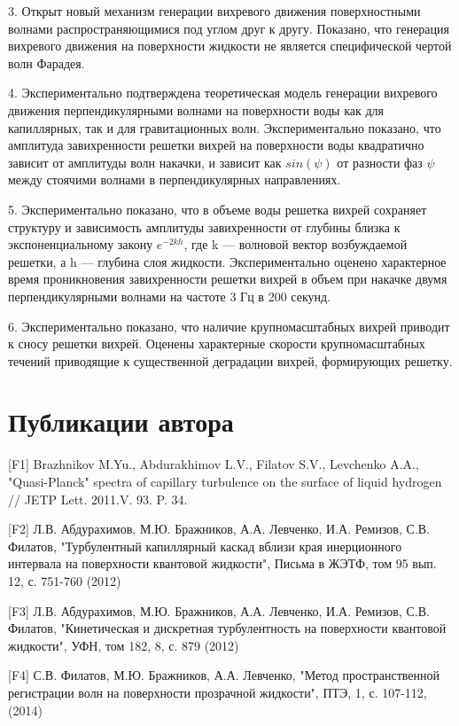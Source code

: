 3. Открыт новый механизм генерации вихревого движения поверхностными волнами распространяющимися под углом друг к другу. Показано, что генерация вихревого движения на поверхности жидкости не является специфической чертой волн Фарадея.

4. Экспериментально подтверждена теоретическая модель генерации вихревого движения перпендикулярными волнами на поверхности воды как для капиллярных, так и для гравитационных волн. Экспериментально показано, что амплитуда завихренности решетки вихрей на поверхности воды квадратично зависит от амплитуды волн накачки, и зависит как $sin(\psi)$ от разности фаз $\psi$ между стоячими волнами в перпендикулярных направлениях. 

5. Экспериментально показано, что в объеме воды решетка вихрей сохраняет структуру и зависимость амплитуды завихренности от глубины близка к экспоненциальному закону $e^{-2kh}$, где k — волновой вектор возбуждаемой решетки, а h — глубина слоя жидкости. 
Экспериментально оценено характерное время проникновения завихренности решетки вихрей в объем при накачке двумя перпендикулярными волнами на частоте 3 Гц в 200 секунд.

6. Экспериментально показано, что наличие крупномасштабных вихрей приводит к сносу решетки вихрей. Оценены характерные скорости крупномасштабных течений приводящие к существенной деградации вихрей, формирующих решетку.


\clearpage 
\chapter*{Публикации автора}	%
%
%
[F1] Brazhnikov M.Yu., Abdurakhimov L.V., Filatov S.V., Levchenko A.A., "Quasi-Planck"{} spectra of capillary turbulence on the surface of liquid hydrogen // JETP Lett. 2011.V. 93. P. 34.

[F2] Л.В. Абдурахимов, М.Ю. Бражников, А.А. Левченко, И.А. Ремизов, С.В. Филатов, "Турбулентный капиллярный каскад вблизи края инерционного интервала на поверхности квантовой жидкости"{}, Письма в ЖЭТФ, том 95 вып. 12, с. 751-760 (2012)

[F3] Л.В. Абдурахимов, М.Ю. Бражников, А.А. Левченко, И.А. Ремизов, С.В. Филатов, "Кинетическая и дискретная турбулентность на поверхности квантовой жидкости"{}, УФН, том 182, 8, с. 879 (2012)

[F4] С.В. Филатов, М.Ю. Бражников, А.А. Левченко, "Метод пространственной регистрации волн на поверхности прозрачной жидкости"{}, ПТЭ, 1, с. 107-112, (2014)

